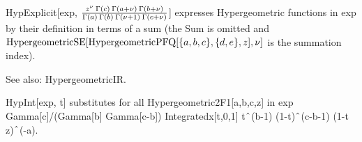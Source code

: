\dispSFinmath{
\infty 
}






HypExplicit[exp, \(\frac{{z^{\nu }}\> \Gamma (c)\> \Gamma (a+\nu )\> \Gamma (b+\nu )}
   {\Gamma (a)\> \Gamma (b)\> \Gamma (\nu +1)\> \Gamma (c+\nu )}\)] expresses Hypergeometric functions in exp by their definition
in terms of a sum (the Sum is omitted and \(\mathrm{HypergeometricSE}[\mathrm{HypergeometricPFQ}[\{a,b,c\},\{d,e\},z],\nu ]\) is the summation
index).

See also:  HypergeometricIR.



\dispSFoutmath{
\nu 
}

\dispSFinmath{
\nu 
}








HypInt[exp, t] { }substitutes for all { }Hypergeometric2F1[a,b,c,z] in exp Gamma[c]/(Gamma[b] Gamma[c-b]) Integratedx[t,0,1] {
  }t\(\RawWedge\)(b-1) (1-t)\(\RawWedge\)(c-b-1) (1-t z)\(\RawWedge\)(-a).


